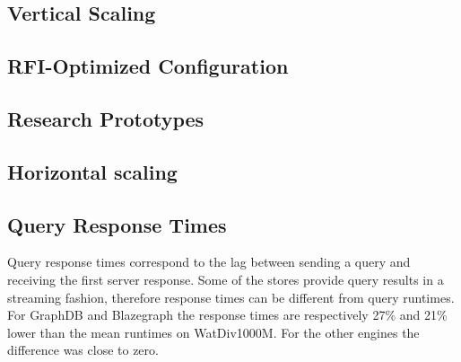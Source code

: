 \subsection{Vertical Scaling}
\label{subsec:vscaling}


\subsection{RFI-Optimized Configuration}
\label{subsec:rfi}


\subsection{Research Prototypes}
\label{subsec:semweb}


\subsection{Horizontal scaling}
\label{subsec:hscaling}


\subsection{Query Response Times}
Query response times correspond to the lag between sending a query and receiving the first server response. Some of the stores provide query results in a streaming fashion, 
therefore response times can be different from query runtimes.
For GraphDB and Blazegraph the response times are respectively 27\% and 21\% lower than the mean runtimes on WatDiv1000M. For the other engines the difference was close to zero.












